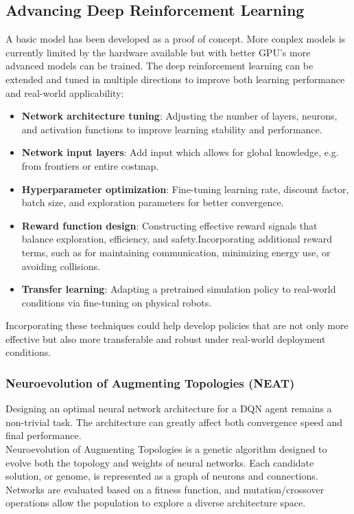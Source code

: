 \subsection{Advancing Deep Reinforcement Learning}
A basic model has been developed as a proof of concept. {\color{red}More conplex models is currently limited by the hardware available but with better GPU's more advanced models can be trained.}
The deep reinforcement learning can be extended and tuned in multiple directions to improve both learning performance and real-world applicability:

\begin{itemize}
  \item \textbf{Network architecture tuning}: Adjusting the number of layers, neurons, and activation functions to improve learning stability and performance.
  \item \textbf{Network input layers}: Add input which allows for global knowledge, e.g. from frontiers or entire costmap.
  \item \textbf{Hyperparameter optimization}: Fine-tuning learning rate, discount factor, batch size, and exploration parameters for better convergence.
  \item \textbf{Reward function design}: Constructing effective reward signals that balance exploration, efficiency, and safety.Incorporating additional reward terms, such as for maintaining communication, minimizing energy use, or avoiding collisions.
  \item \textbf{Transfer learning}: Adapting a pretrained simulation policy to real-world conditions via fine-tuning on physical robots.
\end{itemize}

Incorporating these techniques could help develop policies that are not only more effective but also more transferable and robust under real-world deployment conditions.

\subsubsection{Neuroevolution of Augmenting Topologies (NEAT)}
Designing an optimal neural network architecture for a DQN agent remains a non-trivial task. The architecture can greatly affect both convergence speed and final performance.\\

Neuroevolution of Augmenting Topologies \cite{neat} is a genetic algorithm designed to evolve both the topology and weights of neural networks. Each candidate solution, or genome, is represented as a graph of neurons and connections. Networks are evaluated based on a fitness function, and mutation/crossover operations allow the population to explore a diverse architecture space.\\

